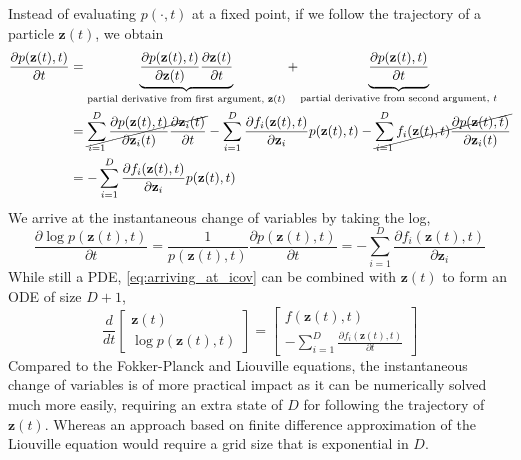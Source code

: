 \documentclass{article}
\newcommand{\vz}{\mathbf{z}}
\newcommand{\sol}{\vz}  %
\begin{document}
\begin{appendices}
Instead of evaluating $p(\cdot, t)$ at a fixed point, if we follow the trajectory of a particle $\sol(t)$, we obtain
\begin{equation}
\begin{split}
\frac{\partial p(\sol(t), t)}{\partial t} &= \underbrace{\frac{\partial p(\sol(t), t)}{\partial \sol(t)}\frac{\partial \sol(t)}{\partial t}}_{\text{partial derivative from first argument, } \sol(t)} + \underbrace{\vphantom{\frac{\partial p(\sol(t), t)}{\partial \sol(t)}}\frac{\partial p(\sol(t), t)}{\partial t}}_{\text{partial derivative from second argument, } t} \\
&= \cancel{\sum_{i=1}^D\frac{\partial p(\sol(t), t)}{\partial \sol_i(t)}\frac{\partial \sol_i(t)}{\partial t}}
- \sum_{i=1}^{D} \frac{\partial f_i(\sol(t), t)}{\partial \sol_i} p(\sol(t), t)
- \cancel{\sum_{i=1}^{D} f_i(\sol(t), t) \frac{\partial p(\sol(t), t)}{\partial \sol_i(t)}} \\
&= - \sum_{i=1}^{D} \frac{\partial f_i(\sol(t), t)}{\partial \sol_i} p(\sol(t), t)
\end{split}
\end{equation}
We arrive at the instantaneous change of variables by taking the log,
\begin{equation}\label{eq:arriving_at_icov}
\frac{\partial \log p(\sol(t), t)}{\partial t} = \frac{1}{p(\sol(t), t)} \frac{\partial p(\sol(t), t)}{\partial t} = - \sum_{i=1}^{D} \frac{\partial f_i(\sol(t), t)}{\partial \sol_i}
\end{equation}
While still a PDE, \eqref{eq:arriving_at_icov} can be combined with $\sol(t)$ to form an ODE of size $D+1$,
\begin{equation}
\frac{d}{dt} \begin{bmatrix}
\sol(t) \\ \log p(\sol(t), t)
\end{bmatrix} = \begin{bmatrix}
f(\sol(t), t) \\ -\sum_{i=1}^{D} \frac{\partial f_i(\sol(t), t)}{\partial t}
\end{bmatrix}
\end{equation}
Compared to the Fokker-Planck and Liouville equations, the instantaneous change of variables is of more practical impact as it can be numerically solved much more easily, requiring an extra state of $D$ for following the trajectory of $\sol(t)$. Whereas an approach based on finite difference approximation of the Liouville equation would require a grid size that is exponential in $D$.




\end{appendices}
\end{document}
